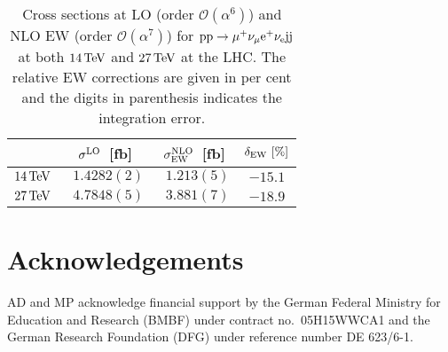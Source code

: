 \documentclass[11pt,epsf]{article}
\newcommand{\MP}[1]{{ {\color{blue}{ [MP: #1]}} }}
\begin{document}
\begin{table}
\begin{center}
\begin{tabular}
{|c||ccc|}
%
\hline
  & $\sigma^{\rm LO}$~[fb] &  $\sigma^{\rm NLO}_{\rm EW}$~[fb] & $\delta_{\rm EW}~[\%]$
\\
\hline
$14\,\text{TeV}$ & $\phantom{1}1.4282(2)$ & $\phantom{1}1.213(5)$& $-15.1$ \\
\hline
$27\,\text{TeV}$ & $\phantom{1}4.7848(5)$ & $\phantom{1}3.881(7)$& $-18.9$ 
\\
\hline
%
\end{tabular}
\end{center}
\caption{Cross sections at LO (order $\mathcal{O}\left(\alpha^6 \right)$) and NLO EW (order $\mathcal{O}\left(\alpha^7 \right)$) for $\text{p} \text{p} \to \mu^+ \nu_\mu \text{e}^+ \nu_{\text{e}} \text{j}\text{j}$ at both $14\,\text{TeV}$ and $27\,\text{TeV}$ at the LHC.
The relative EW corrections are given in per cent and the digits in parenthesis indicates the integration error.}
\label{tab:EWxsec}
\end{table}

% 


    
\section*{Acknowledgements}

AD and MP acknowledge financial support by the
German Federal Ministry for Education and Research (BMBF) under
contract no.~05H15WWCA1 and the German Research Foundation (DFG) under
reference number DE 623/6-1.





\end{document}
